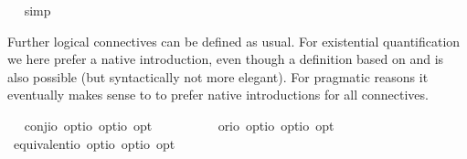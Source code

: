 \begin{isabellebody}
\isadelimproof
\ %
\endisadelimproof
%
\isatagproof
{}\isamarkupfalse%
\ simp\ \isamarkupfalse%
\ \ %
%
\endisatagproof
{\isafoldproof}%
%
\isadelimproof
%
\endisadelimproof
%
\isamarkuptrue%
%
\begin{isamarkuptext}%
Further logical connectives can be defined as usual. For existential quantification we here
  prefer a native introduction, even though a definition based on \isa{\isactrlbold {\isasymnot}} and \isa{\isactrlbold {\isasymforall}} is also
  possible (but syntactically not more elegant). For pragmatic reasons it eventually makes sense to 
  to prefer native introductions for all connectives.%
\end{isamarkuptext}%
\isamarkuptrue%
\ \isamarkupfalse%
\ conj{\isacharcolon}{\isacharcolon}{\isachardoublequoteopen}io\ opt{\isasymRightarrow}io\ opt{\isasymRightarrow}io\ opt{\isachardoublequoteclose}\ {\isacharparenleft}\ {\isachardoublequoteopen}\isactrlbold {\isasymand}{\isachardoublequoteclose}\ {}{}{\isacharparenright}\ \ {\isachardoublequoteopen}{\isasymphi}\isactrlbold {\isasymand}{\isasympsi}\ {\isasymequiv}\ \isactrlbold {\isasymnot}{\isacharparenleft}{\isasymphi}\isactrlbold {\isasymrightarrow}\isactrlbold {\isasymnot}{\isasympsi}{\isacharparenright}{\isachardoublequoteclose}\isanewline
\ \isamarkupfalse%
\ or{\isacharcolon}{\isacharcolon}{\isachardoublequoteopen}io\ opt{\isasymRightarrow}io\ opt{\isasymRightarrow}io\ opt{\isachardoublequoteclose}\ {\isacharparenleft}\ {\isachardoublequoteopen}\isactrlbold {\isasymor}{\isachardoublequoteclose}\ {}{}{\isacharparenright}\ \ {\isachardoublequoteopen}{\isasymphi}\isactrlbold {\isasymor}{\isasympsi}\ {\isasymequiv}\ \isactrlbold {\isasymnot}{\isasymphi}\isactrlbold {\isasymrightarrow}{\isasympsi}{\isachardoublequoteclose}\isanewline
\ \isamarkupfalse%
\ equivalent{\isacharcolon}{\isacharcolon}{\isachardoublequoteopen}io\ opt{\isasymRightarrow}io\ opt{\isasymRightarrow}io\ opt{\isachardoublequoteclose}\ {\isacharparenleft}\ {\isachardoublequoteopen}\isactrlbold {\isasymequiv}{\isachardoublequoteclose}\ {}{}{\isacharparenright}\ \ {\isachardoublequoteopen}{\isasymphi}\isactrlbold {\isasymequiv}{\isasympsi}\ {\isasymequiv}\ {\isacharparenleft}{\isasymphi}\isactrlbold {\isasymrightarrow}{\isasympsi}{\isacharparenright}\isactrlbold {\isasymand}{\isacharparenleft}{\isasympsi}\isactrlbold {\isasymrightarrow}{\isasymphi}{\isacharparenright}{\isachardoublequoteclose}\isanewline

\end{isabellebody}
